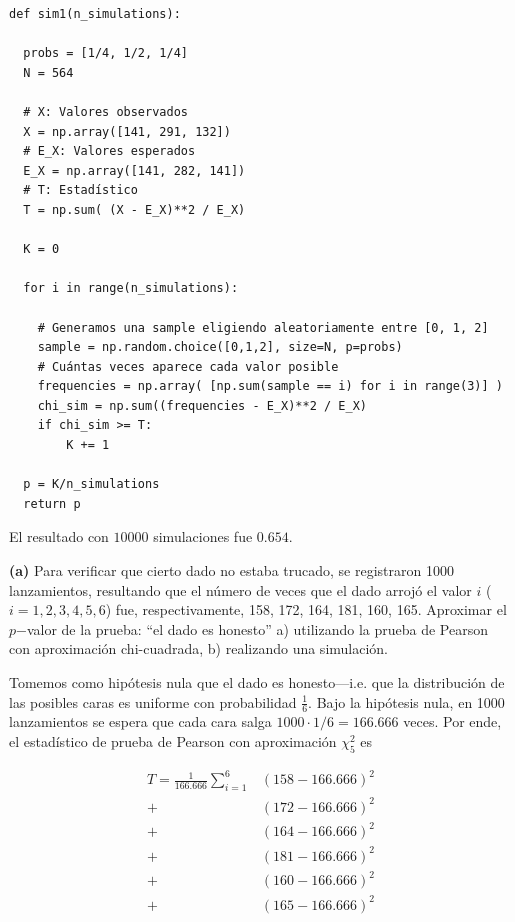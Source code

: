 \documentclass[a4paper, 12pt]{article}
\begin{document}
\begin{verbatim}
def sim1(n_simulations):

  probs = [1/4, 1/2, 1/4]
  N = 564 

  # X: Valores observados
  X = np.array([141, 291, 132])
  # E_X: Valores esperados
  E_X = np.array([141, 282, 141])
  # T: Estadístico
  T = np.sum( (X - E_X)**2 / E_X)

  K = 0 
  
  for i in range(n_simulations):

    # Generamos una sample eligiendo aleatoriamente entre [0, 1, 2]
    sample = np.random.choice([0,1,2], size=N, p=probs)
    # Cuántas veces aparece cada valor posible
    frequencies = np.array( [np.sum(sample == i) for i in range(3)] )
    chi_sim = np.sum((frequencies - E_X)**2 / E_X)
    if chi_sim >= T:
        K += 1

  p = K/n_simulations
  return p
\end{verbatim}

El resultado con $10000$ simulaciones fue $0.654$.

\pagebreak 

\begin{myframe}
    \textbf{(a)} Para verificar que cierto dado no estaba trucado, se
    registraron 1000 lanzamientos, resultando que el número de veces que el dado
    arrojó el valor $i$ ($i = 1,2,3,4,5,6$) fue, respectivamente, 158, 172, 164,
    181, 160, 165. Aproximar el $p$−valor de la prueba: “el dado es honesto” a)
    utilizando la prueba de Pearson con aproximación chi-cuadrada, b) realizando
    una simulación.
\end{myframe}

Tomemos como hipótesis nula que el dado es honesto---i.e. que la distribución de
las posibles caras es uniforme con probabilidad $\frac{1}{6}$. Bajo la hipótesis
nula, en 1000 lanzamientos se espera que cada cara salga $1000 \cdot 1 / 6 =
166.666$ veces. Por ende, el estadístico de prueba de Pearson con aproximación
$\chi^2_5$ es 

\begin{align*}
    T = \frac{1}{166.666}\sum_{i=1}^6 &(158 - 166.666)^2 \\ 
    + &(172 - 166.666)^2 \\ 
    + &(164 - 166.666)^2 \\ 
    + &(181 - 166.666)^2  \\ 
    + &(160 - 166.666)^2 \\ 
    +  &(165 - 166.666)^2
\end{align*}
\end{document}
